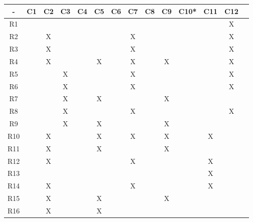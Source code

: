 \begin{table}[H]
\centering
\begin{tabular}{|c|c|c|c|c|c|c|c|c|c|c|c|c|c|} 
\hline
\rowcolor[rgb]{0.71,0.102,0} -     & C1 & C2 & C3 & C4 & C5 & C6 & C7 & C8 & C9 & C10* & C11 & C12  \\ 
\hline
{\cellcolor[rgb]{0.71,0.102,0}}R1  &    &    &    &    &    &    &    &    &    &      &     & X    \\ 
\hline
{\cellcolor[rgb]{0.71,0.102,0}}R2  &    & X  &    &    &    &    & X  &    &    &      &     & X    \\ 
\hline
{\cellcolor[rgb]{0.71,0.102,0}}R3  &    & X  &    &    &    &    & X  &    &    &      &     & X    \\ 
\hline
{\cellcolor[rgb]{0.71,0.102,0}}R4  &    & X  &    &    & X  &    & X  &    & X  &      &     & X    \\ 
\hline
{\cellcolor[rgb]{0.71,0.102,0}}R5  &    &    & X  &    &    &    & X  &    &    &      &     & X    \\ 
\hline
{\cellcolor[rgb]{0.71,0.102,0}}R6  &    &    & X  &    &    &    & X  &    &    &      &     & X    \\ 
\hline
{\cellcolor[rgb]{0.71,0.102,0}}R7  &    &    & X  &    & X  &    &    &    & X  &      &     &      \\ 
\hline
{\cellcolor[rgb]{0.71,0.102,0}}R8  &    &    & X  &    &    &    & X  &    &    &      &     & X    \\ 
\hline
{\cellcolor[rgb]{0.71,0.102,0}}R9  &    &    & X  &    & X  &    &    &    & X  &      &     &      \\ 
\hline
{\cellcolor[rgb]{0.71,0.102,0}}R10 &    & X  &    &    & X  &    & X  &    & X  &      & X   &      \\ 
\hline
{\cellcolor[rgb]{0.71,0.102,0}}R11 &    & X  &    &    & X  &    &    &    & X  &      &     &      \\ 
\hline
{\cellcolor[rgb]{0.71,0.102,0}}R12 &    & X  &    &    &    &    & X  &    &    &      & X   &      \\ 
\hline
{\cellcolor[rgb]{0.71,0.102,0}}R13 &    &    &    &    &    &    &    &    &    &      & X   &      \\ 
\hline
{\cellcolor[rgb]{0.71,0.102,0}}R14 &    & X  &    &    &    &    & X  &    &    &      & X   &      \\ 
\hline
{\cellcolor[rgb]{0.71,0.102,0}}R15 &    & X  &    &    & X  &    &    &    & X  &      &     &      \\ 
\hline
{\cellcolor[rgb]{0.71,0.102,0}}R16 &    & X  &    &    & X  &    &    &    &    &      &     &      \\ 

\end{tabular}
\end{table}
